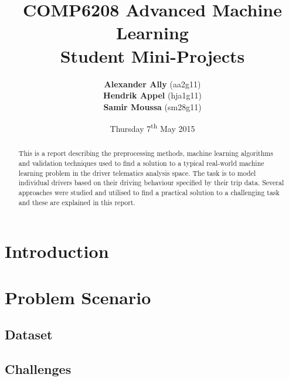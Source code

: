 \documentclass[a4paper, 11pt, twocolumn]{report}
\begin{document}
\lstset{language=Matlab, basicstyle=\small}
\title{\textbf{COMP6208 Advanced Machine Learning} \\
{\Large Student Mini-Projects}}

\author{\textbf{Alexander Ally} (aa2g11)\\
\textbf{Hendrik Appel} (hja1g11)\\
\textbf{Samir Moussa} (sm28g11)}

\date{Thursday 7\textsuperscript{th} May 2015}
\maketitle

\begin{abstract}

This is a report describing the preprocessing methods, machine learning algorithms and validation techniques used to find a solution to a typical real-world machine learning problem in the driver telematics analysis space. The task is to model individual drivers based on their driving behaviour specified by their trip data. Several approaches were studied and utilised to find a practical solution to a challenging task and these are explained in this report.

\end{abstract}

\section{Introduction}





\section{Problem Scenario}

\subsection{Dataset}

\subsection{Challenges}
\end{document}
